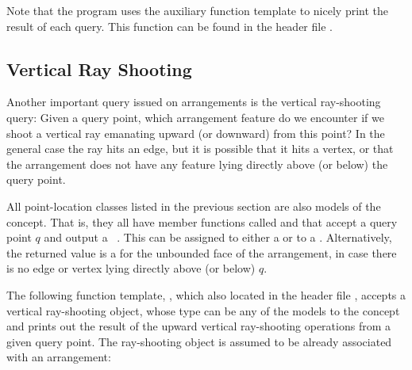 Note that the program uses the auxiliary
 function template to nicely print the
result of each query. This function can be found in the header file
.

\subsection{Vertical Ray Shooting}
\label{arr_ssec:ray_shoot}
%
Another important query issued on arrangements is the vertical
ray-shooting query: Given a query point, which arrangement feature
do we encounter if we shoot a vertical ray emanating upward (or
downward) from this point? In the general case the ray hits an
edge, but it is possible that it hits a vertex, or that the
arrangement does not have any feature lying directly above (or
below) the query point.

All point-location classes listed in the previous section are also models
of the  concept. That is, they all
have member functions called  and
 that accept a query point $q$ and output a
\cgal\ . This can be assigned to either a
 or to a .
Alternatively, the returned value is a 
for the unbounded face of the arrangement, in case there is no edge
or vertex lying directly above (or below) $q$.

The following function template, ,
which also located in the header file ,
accepts a vertical ray-shooting
object, whose type can be any of the models to the
 concept and prints out the
result of the upward vertical ray-shooting operations from a given
query point. The ray-shooting object  is assumed to be
already associated with an arrangement:

